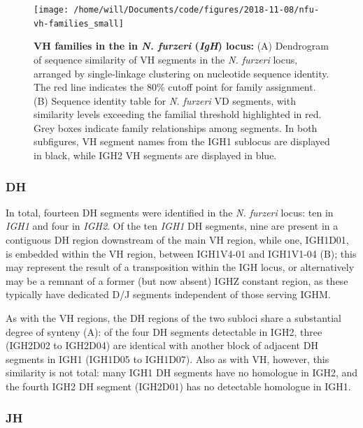 	\begin{figure}
	\centering
	\texttt{[image: /home/will/Documents/code/figures/2018-11-08/nfu-vh-families\_small]} %
	\caption[VH families in the in \textit{N. furzeri} \textit{IgH} locus]{\textbf{VH families in the in \textit{N. furzeri} (\textit{IgH}) locus:} (A) Dendrogram of sequence similarity of VH segments in the \textit{N. furzeri} locus, arranged by single-linkage clustering on nucleotide sequence identity. The red line indicates the 80\% cutoff point for family assignment. (B) Sequence identity table for \textit{N. furzeri} VD segments, with similarity levels exceeding the familial threshold highlighted in red. Grey boxes indicate family relationships among segments. In both subfigures, VH segment names from the IGH1 sublocus are displayed in black, while IGH2 VH segments are displayed in blue.}
	\label{fig:nfu-vh-families}
	\end{figure}

	
	
	\subsubsection{DH}
	
	In total, fourteen DH segments were identified in the \textit{N. furzeri} locus: ten in \textit{IGH1} and four in \textit{IGH2}. Of the ten \textit{IGH1} DH segments, nine are present in a contiguous DH region downstream of the main VH region, while one, IGH1D01, is embedded within the VH region, between IGH1V4-01 and IGH1V1-04 (B); this may represent the result of a transposition within the IGH locus, or alternatively may be a remnant of a former (but now absent) IGHZ constant region, as these typically have dedicated D/J segments independent of those serving IGHM.
	
	As with the VH regions, the DH regions of the two subloci share a substantial degree of synteny (A): of the four DH segments detectable in IGH2, three (IGH2D02 to IGH2D04) are identical with another block of adjacent DH segments in IGH1 (IGH1D05 to IGH1D07). Also as with VH, however, this similarity is not total: many IGH1 DH segments have no homologue in IGH2, and the fourth IGH2 DH segment (IGH2D01) has no detectable homologue in IGH1. 
	
	\subsubsection{JH}
	
